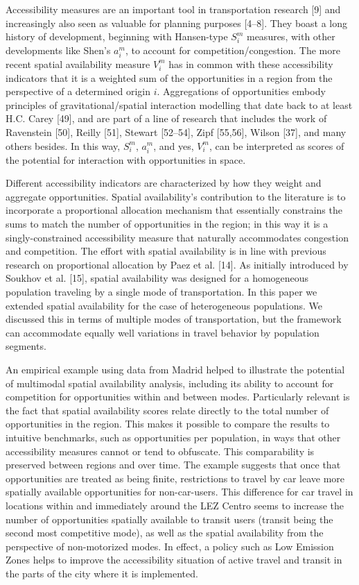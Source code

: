\documentclass[10pt,letterpaper]{article}
\begin{document}
Accessibility measures are an important tool in transportation research
{[}9{]} and increasingly also seen as valuable for planning purposes
{[}4--8{]}. They boast a long history of development, beginning with
Hansen-type \(S_i^m\) measures, with other developments like Shen's
\(a_i^m\), to account for competition/congestion. The more recent
spatial availability measure \(V_i^m\) has in common with these
accessibility indicators that it is a weighted sum of the opportunities
in a region from the perspective of a determined origin \(i\).
Aggregations of opportunities embody principles of gravitational/spatial
interaction modelling that date back to at least H.C. Carey {[}49{]},
and are part of a line of research that includes the work of Ravenstein
{[}50{]}, Reilly {[}51{]}, Stewart {[}52--54{]}, Zipf {[}55,56{]},
Wilson {[}37{]}, and many others besides. In this way, \(S_i^m\),
\(a_i^m\), and yes, \(V_i^m\), can be interpreted as scores of the
potential for interaction with opportunities in space.

Different accessibility indicators are characterized by how they weight
and aggregate opportunities. Spatial availability's contribution to the
literature is to incorporate a proportional allocation mechanism that
essentially constrains the sums to match the number of opportunities in
the region; in this way it is a singly-constrained accessibility measure
that naturally accommodates congestion and competition. The effort with
spatial availability is in line with previous research on proportional
allocation by Paez et al. {[}14{]}. As initially introduced by Soukhov
et al. {[}15{]}, spatial availability was designed for a homogeneous
population traveling by a single mode of transportation. In this paper
we extended spatial availability for the case of heterogeneous
populations. We discussed this in terms of multiple modes of
transportation, but the framework can accommodate equally well
variations in travel behavior by population segments.

An empirical example using data from Madrid helped to illustrate the
potential of multimodal spatial availability analysis, including its
ability to account for competition for opportunities within and between
modes. Particularly relevant is the fact that spatial availability
scores relate directly to the total number of opportunities in the
region. This makes it possible to compare the results to intuitive
benchmarks, such as opportunities per population, in ways that other
accessibility measures cannot or tend to obfuscate. This comparability
is preserved between regions and over time. The example suggests that
once that opportunities are treated as being finite, restrictions to
travel by car leave more spatially available opportunities for
non-car-users. This difference for car travel in locations within and
immediately around the LEZ Centro seems to increase the number of
opportunities spatially available to transit users (transit being the
second most competitive mode), as well as the spatial availability from
the perspective of non-motorized modes. In effect, a policy such as Low
Emission Zones helps to improve the accessibility situation of active
travel and transit in the parts of the city where it is implemented.
\end{document}
